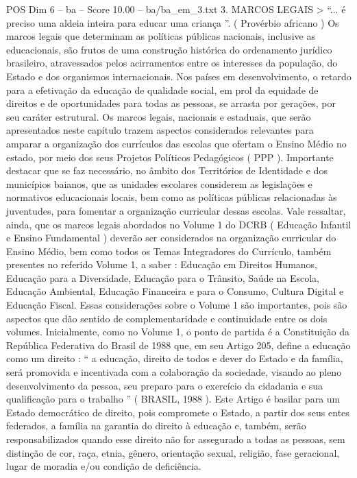 \begin{textsample}{POS Dim 6 – ba – Score 10.00 – ba/ba\_em\_3.txt}  \label{ex:f6_pos_072}
3.
MARCOS LEGAIS > “... é preciso uma aldeia inteira para educar uma criança ”. ( Provérbio africano ) Os marcos legais que determinam as políticas públicas nacionais, inclusive as educacionais, são frutos de uma construção histórica do ordenamento jurídico brasileiro, atravessados pelos acirramentos entre os interesses da população, do Estado e dos organismos internacionais.
Nos países em desenvolvimento, o retardo para a efetivação da educação de qualidade social, em prol da equidade de direitos e de oportunidades para todas as pessoas, se arrasta por gerações, por seu caráter estrutural.
Os marcos legais, nacionais e estaduais, que serão apresentados neste capítulo trazem aspectos considerados relevantes para amparar a organização dos currículos das escolas que ofertam o Ensino Médio no estado, por meio dos seus Projetos Políticos Pedagógicos ( PPP ).
Importante destacar que se faz necessário, no âmbito dos Territórios de Identidade e dos municípios baianos, que as unidades escolares considerem as legislações e normativos educacionais locais, bem como as políticas públicas relacionadas às juventudes, para fomentar a organização curricular dessas escolas.
Vale ressaltar, ainda, que os marcos legais abordados no Volume 1 do DCRB ( Educação Infantil e Ensino Fundamental ) deverão ser considerados na organização curricular do Ensino Médio, bem como todos os Temas Integradores do Currículo, também presentes no referido Volume 1, a saber : Educação em Direitos Humanos, Educação para a Diversidade, Educação para o Trânsito, Saúde na Escola, Educação Ambiental, Educação Financeira e para o Consumo, Cultura Digital e Educação Fiscal.
Essas considerações sobre o Volume 1 são importantes, pois são aspectos que dão sentido de complementaridade e continuidade entre os dois volumes.
Inicialmente, como no Volume 1, o ponto de partida é a Constituição da República Federativa do Brasil de 1988 que, em seu Artigo 205, define a educação como um direito : “ a educação, direito de todos e dever do Estado e da família, será promovida e incentivada com a colaboração da sociedade, visando ao pleno desenvolvimento da pessoa, seu preparo para o exercício da cidadania e sua qualificação para o trabalho ” ( BRASIL, 1988 ).
Este Artigo é basilar para um Estado democrático de direito, pois compromete o Estado, a partir dos seus entes federados, a família na garantia do direito à educação e, também, serão responsabilizados quando esse direito não for assegurado a todas as pessoas, sem distinção de cor, raça, etnia, gênero, orientação sexual, religião, fase geracional, lugar de moradia e/ou condição de deficiência.

\end{textsample}
